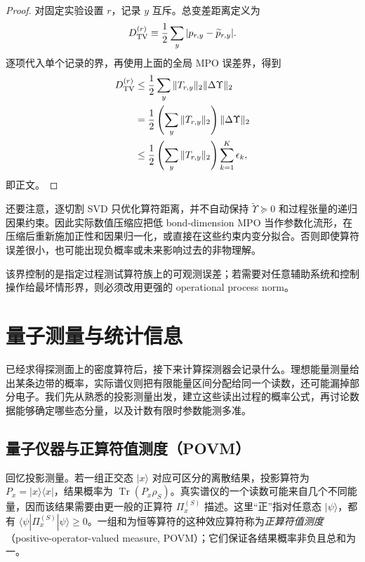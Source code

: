 \begin{proof}
对固定实验设置 $r$，记录 $y$ 互斥。总变差距离定义为
\[
D_{\rm TV}^{(r)}
\equiv
\frac12\sum_y|p_{r,y}-\widetilde p_{r,y}|.
\]
逐项代入单个记录的界，再使用上面的全局 MPO 误差界，得到
\begin{align*}
D_{\rm TV}^{(r)}
&\le\frac12\sum_y
\|T_{r,y}\|_2\|\Delta\Upsilon\|_2\\
&=\frac12
\left(\sum_y\|T_{r,y}\|_2\right)
\|\Delta\Upsilon\|_2\\
&\le\frac12
\left(\sum_y\|T_{r,y}\|_2\right)
\sum_{k=1}^{K}\epsilon_k,
\end{align*}
即正文。
\end{proof}


还要注意，逐切割 SVD 只优化算符距离，并不自动保持 $\widetilde\Upsilon\succeq0$ 和过程张量的递归因果约束。因此实际数值压缩应把低 bond-dimension MPO 当作参数化流形，在压缩后重新施加正性和因果归一化，或直接在这些约束内变分拟合。否则即使算符误差很小，也可能出现负概率或未来影响过去的非物理解。

该界控制的是指定过程测试算符族上的可观测误差；若需要对任意辅助系统和控制操作给最坏情形界，则必须改用更强的 operational process norm。

\section{量子测量与统计信息}

已经求得探测面上的密度算符后，接下来计算探测器会记录什么。理想能量测量给出某条边带的概率，实际谱仪则把有限能量区间分配给同一个读数，还可能漏掉部分电子。我们先从熟悉的投影测量出发，建立这些读出过程的概率公式，再讨论数据能够确定哪些态分量，以及计数有限时参数能测多准。

\subsection{量子仪器与正算符值测度（POVM）}

回忆投影测量。若一组正交态 $|x\rangle$ 对应可区分的离散结果，投影算符为 $P_x=|x\rangle\langle x|$，结果概率为 $\operatorname{Tr}(P_x\rho_S)$。真实谱仪的一个读数可能来自几个不同能量，因而该结果需要由更一般的正算符 $\Pi_x^{(S)}$ 描述。这里“正”指对任意态 $|\psi\rangle$，都有 $\langle\psi|\Pi_x^{(S)}|\psi\rangle\ge0$。一组和为恒等算符的这种效应算符称为\emph{正算符值测度}（positive-operator-valued measure, POVM）；它们保证各结果概率非负且总和为一。

